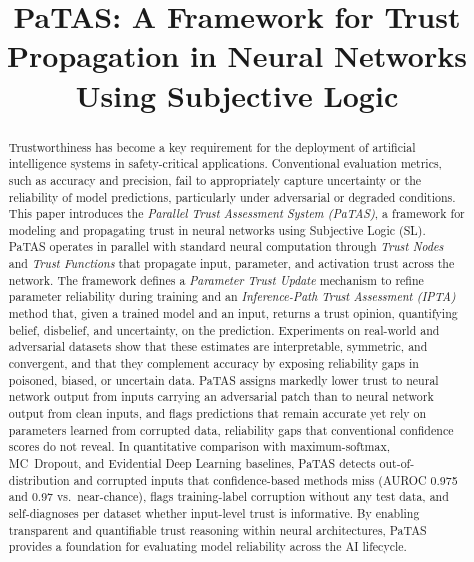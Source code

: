 \documentclass[conference]{IEEEtran}
\begin{document}
\title{PaTAS: A Framework for Trust Propagation in Neural Networks Using Subjective Logic}


\maketitle

\begin{abstract}
Trustworthiness has become a key requirement for the deployment of artificial intelligence systems in safety-critical applications. Conventional evaluation metrics, such as accuracy and precision, fail to appropriately capture uncertainty or the reliability of model predictions, particularly under adversarial or degraded conditions. This paper introduces the \emph{Parallel Trust Assessment System (PaTAS)}, a framework for modeling and propagating trust in neural networks using Subjective Logic (SL). PaTAS operates in parallel with standard neural computation through \emph{Trust Nodes} and \emph{Trust Functions} that propagate input, parameter, and activation trust across the network. The framework defines a \emph{Parameter Trust Update} mechanism to refine parameter reliability during training and an \emph{Inference-Path Trust Assessment (IPTA)} method that, given a trained model and an input, returns a trust opinion, quantifying belief, disbelief, and uncertainty, on the prediction. Experiments on real-world and adversarial datasets show that these estimates are interpretable, symmetric, and convergent, and that they complement accuracy by exposing reliability gaps in poisoned, biased, or uncertain data. PaTAS assigns markedly lower trust to neural network output from inputs carrying an adversarial patch than to neural network output from clean inputs, and flags predictions that remain accurate yet rely on parameters learned from corrupted data, reliability gaps that conventional confidence scores do not reveal. In quantitative comparison with maximum-softmax, MC~Dropout, and Evidential Deep Learning baselines, PaTAS detects out-of-distribution and corrupted inputs that confidence-based methods miss (AUROC 0.975 and 0.97 vs.\ near-chance), flags training-label corruption without any test data, and self-diagnoses per dataset whether input-level trust is informative. By enabling transparent and quantifiable trust reasoning within neural architectures, PaTAS provides a foundation for evaluating model reliability across the AI lifecycle.
\end{abstract}
\end{document}
